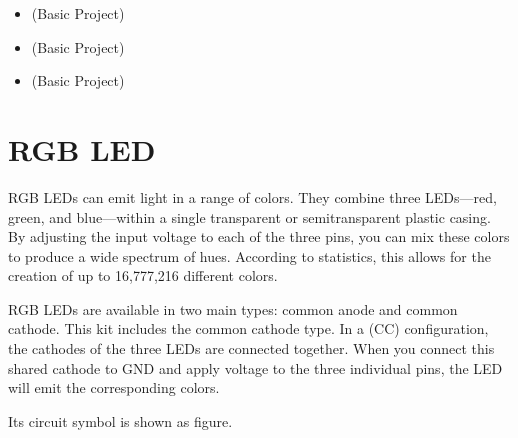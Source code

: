 \documentclass[a4paper,11pt,english]{sphinxmanual}
\let\sphinxpxdimen\pdfpxdimen\else\newdimen\sphinxpxdimen
\begin{document}
\sphinxAtStartPar
{}
\begin{itemize}
\item {} 
\sphinxAtStartPar
{\hyperref[\detokenize{Basic_Project/LED_Blink:basic-led-blink}]{}} (Basic Project)

\item {} 
\sphinxAtStartPar
{\hyperref[\detokenize{Basic_Project/Button_LED:basic-button-led}]{}} (Basic Project)

\item {} 
\sphinxAtStartPar
{\hyperref[\detokenize{Basic_Project/2_Channel_Relay_Module:basic-2-channel-relay-module}]{}} (Basic Project)

\end{itemize}

\sphinxstepscope


\section{RGB LED}
\label{\detokenize{Components_Kit/component_rgb_led:rgb-led}}\label{\detokenize{Components_Kit/component_rgb_led:cpn-rgb-led}}\label{\detokenize{Components_Kit/component_rgb_led::doc}}
\noindent\sphinxincludegraphics[width=100\sphinxpxdimen]{{rgb_led}.png}

\sphinxAtStartPar
RGB LEDs can emit light in a range of colors. They combine three LEDs—red, green, and blue—within a single transparent or semitransparent plastic casing. By adjusting the input voltage to each of the three pins, you can mix these colors to produce a wide spectrum of hues. According to statistics, this allows for the creation of up to 16,777,216 different colors.

\noindent\sphinxincludegraphics[width=600\sphinxpxdimen]{{rgb_light}.png}

\sphinxAtStartPar
RGB LEDs are available in two main types: common anode and common cathode. This kit includes the common cathode type. In a  (CC) configuration, the cathodes of the three LEDs are connected together. When you connect this shared cathode to GND and apply voltage to the three individual pins, the LED will emit the corresponding colors.

\sphinxAtStartPar
Its circuit symbol is shown as figure.
\end{document}
